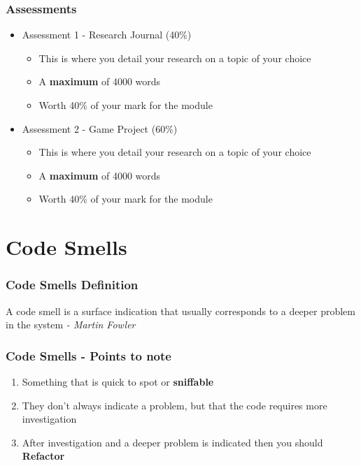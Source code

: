 \begin{frame}
	\frametitle{Assessments}
	\begin{itemize}
		\item Assessment 1 - Research Journal (40\%)
		\begin{itemize}
			\item This is where you detail your research on a topic of your choice
			\item A \textbf{maximum} of 4000 words
			\item Worth 40\% of your mark for the module
		\end{itemize}
		\item Assessment 2 - Game Project (60\%)
		\begin{itemize}
			\item This is where you detail your research on a topic of your choice
		\item A \textbf{maximum} of 4000 words
		\item Worth 40\% of your mark for the module
		\end{itemize}		
	\end{itemize}
\end{frame}

\section{Code Smells}

\begin{frame}
\frametitle{Code Smells Definition}
\begin{center}
	A code smell is a surface indication that usually corresponds to a deeper problem in the system \linebreak \linebreak 
	\small{\textit{- Martin Fowler}}
\end{center}
\end{frame}

\begin{frame}
\frametitle{Code Smells - Points to note}
\begin{enumerate}
	\item Something that is quick to spot or \textbf{sniffable}
	\item They don't always indicate a problem, but that the code requires more investigation
	\item After investigation and a deeper problem is indicated then you should \textbf{Refactor}
\end{enumerate}
\end{frame}

